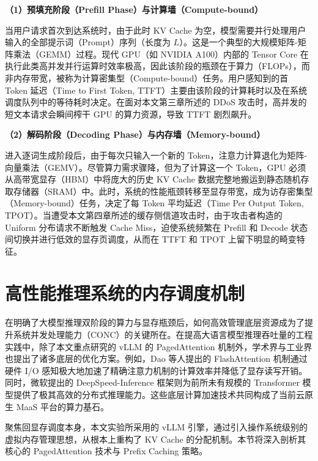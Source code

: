\documentclass[master, vlined]{DissertUESTC}
\begin{document}
	\textbf{（1）预填充阶段（Prefill Phase）与计算墙（Compute-bound）}

	当用户请求首次到达系统时，由于此时 KV Cache 为空，模型需要并行处理用户输入的全部提示词（Prompt）序列（长度为 $L$）。这是一个典型的大规模矩阵-矩阵乘法（GEMM）过程。现代 GPU（如 NVIDIA A100）内部的 Tensor Core 在执行此类高并发并行运算时效率极高，因此该阶段的瓶颈在于算力（FLOPs），而非内存带宽，被称为计算密集型（Compute-bound）任务。用户感知到的首 Token 延迟（Time to First Token, TTFT）主要由该阶段的计算耗时以及在系统调度队列中的等待耗时决定。在面对本文第三章所述的 DDoS 攻击时，高并发的短文本请求会瞬间榨干 GPU 的算力资源，导致 TTFT 剧烈飙升。

	\textbf{（2）解码阶段（Decoding Phase）与内存墙（Memory-bound）} 

	进入逐词生成阶段后，由于每次只输入一个新的 Token，注意力计算退化为矩阵-向量乘法（GEMV）。尽管算力需求骤降，但为了计算这一个 Token，GPU 必须从高带宽显存（HBM）中将庞大的历史 KV Cache 数据完整地搬运到静态随机存取存储器（SRAM）中。此时，系统的性能瓶颈转移至显存带宽，成为访存密集型（Memory-bound）任务，决定了每 Token 平均延迟（Time Per Output Token, TPOT）。当遭受本文第四章所述的缓存侧信道攻击时，由于攻击者构造的 Uniform 分布请求不断触发 Cache Miss，迫使系统频繁在 Prefill 和 Decode 状态间切换并进行低效的显存页调度，从而在 TTFT 和 TPOT 上留下明显的畸变特征。

	\section{高性能推理系统的内存调度机制}
    \label{sec:高性能推理系统的内存调度机制}
    
    在明确了大模型推理双阶段的算力与显存瓶颈后，如何高效管理底层资源成为了提升系统并发处理能力（CONC）的关键所在。在提高大语言模型推理吞吐量的工程实践中，除了本文重点研究的 vLLM 的 PagedAttention 机制外，学术界与工业界也提出了诸多底层的优化方案。例如，Dao 等人提出的 FlashAttention 机制通过硬件 I/O 感知极大地加速了精确注意力机制的计算效率并降低了显存读写开销\cite{FlashAttention快速且内存高效的精确注意力机制}。同时，微软提出的 DeepSpeed-Inference 框架则为前所未有规模的 Transformer 模型提供了极其高效的分布式推理能力\cite{DeepSpeed实现前所未有规模的Transformer模型高效推理}。这些底层计算加速技术共同构成了当前云原生 MaaS 平台的算力基石。
    
    聚焦回显存调度本身，本文实验所采用的 vLLM 引擎，通过引入操作系统级别的虚拟内存管理思想，从根本上重构了 KV Cache 的分配机制。本节将深入剖析其核心的 PagedAttention 技术与 Prefix Caching 策略。
\end{document}
